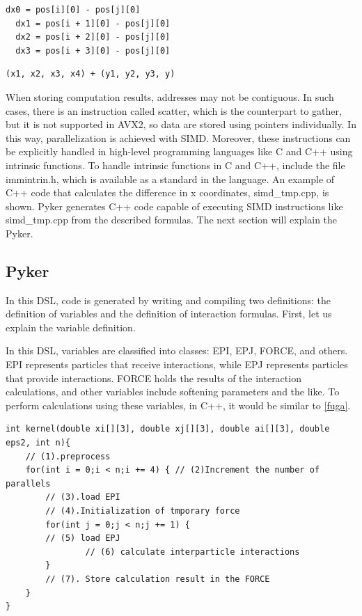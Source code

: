\documentclass[ams, a4j]{U-AizuGT}
\begin{document}
\begin{lstlisting}[frame=single]
  dx0 = pos[i][0] - pos[j][0]
  dx1 = pos[i + 1][0] - pos[j][0]
  dx2 = pos[i + 2][0] - pos[j][0]
  dx3 = pos[i + 3][0] - pos[j][0]
\end{lstlisting}

\begin{lstlisting}[frame=single]
  (x1, x2, x3, x4) + (y1, y2, y3, y)

\end{lstlisting}


When storing computation results, addresses may 
not be contiguous. In such cases, there is an instruction called scatter, which is the counterpart to gather, but it is not supported 
in AVX2, so data are stored using pointers individually. In this way, parallelization is achieved with SIMD. Moreover, these instructions
can be explicitly handled in high-level programming languages like C and C++ using intrinsic functions. To handle intrinsic functions 
in C and C++, include the file immintrin.h, which is available as a standard in the language. An example of C++ code that calculates the difference in x coordinates, simd\_tmp.cpp, is shown. { Pyker}  generates C++ code capable of executing SIMD instructions like simd\_tmp.cpp
from the described formulas. The next section will explain the Pyker.


\subsection{Pyker}
In this DSL, code is generated by writing and compiling two definitions: the definition of variables and the definition of interaction formulas. First, let us explain the variable definition.


In this DSL, variables are classified into classes: EPI, EPJ, FORCE, and others. EPI represents particles that receive interactions, 
while EPJ represents particles that provide interactions. FORCE holds the results of the interaction calculations, and other variables 
include softening parameters and the like. To perform calculations using these variables, in C++, it would be similar to \ref{fuga}.



\begin{lstlisting}[frame=single, caption=skeleton code, label=fuga]
int kernel(double xi[][3], double xj[][3], double ai[][3], double eps2, int n){
	// (1).preprocess
	for(int i = 0;i < n;i += 4) { // (2)Increment the number of parallels
		// (3).load EPI
		// (4).Initialization of tmporary force
		for(int j = 0;j < n;j += 1) {
        // (5) load EPJ
				// (6) calculate interparticle interactions
		}
		// (7). Store calculation result in the FORCE
	}
}
\end{lstlisting}
\end{document}
